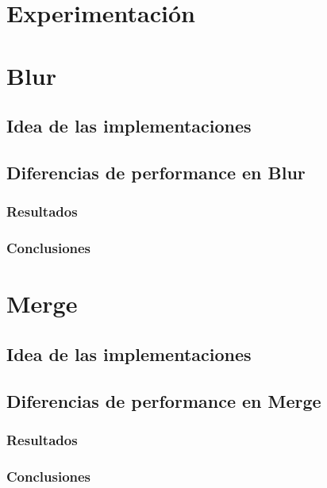 \documentclass[a4paper]{article}
\begin{document}
\newpage

\section{Experimentación}


\newpage

\section{Blur}

\subsection{Idea de las implementaciones}

\subsection{Diferencias de performance en Blur}


\subsubsection{Resultados}


\subsubsection{Conclusiones}


\newpage
\section{Merge}

\subsection{Idea de las implementaciones}

\subsection{Diferencias de performance en Merge}


\subsubsection{Resultados}

\subsubsection{Conclusiones}
\end{document}
